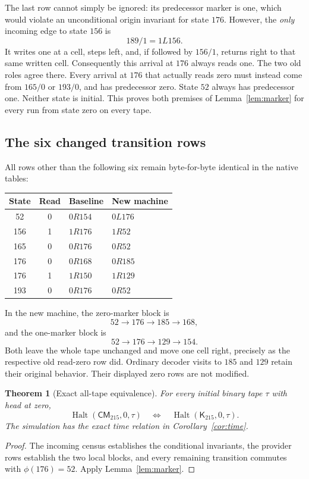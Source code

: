 \documentclass[11pt]{article}
\newtheorem{theorem}{Theorem}[section]
\theoremstyle{definition}\newtheorem{definition}[theorem]{Definition}
\theoremstyle{remark}\newtheorem{remark}[theorem]{Remark}
\newcommand{\Halt}{\operatorname{Halt}}
\newcommand{\Kold}{\mathsf{K}_{215}}
\newcommand{\Knew}{\mathsf{CM}_{215}}
\begin{document}
The last row cannot simply be ignored: its predecessor marker is one,
which would violate an unconditional origin invariant for state $176$.
However, the \emph{only} incoming edge to state $156$ is
\[
 189/1=1L156.
\]
It writes one at a cell, steps left, and, if followed by $156/1$, returns
right to that same written cell. Consequently this arrival at $176$
always reads one. The two old roles agree there. Every arrival at $176$
that actually reads zero must instead come from $165/0$ or $193/0$, and
has predecessor zero. State $52$ always has predecessor one. Neither
state is initial. This proves both premises of Lemma~\ref{lem:marker}
for every run from state zero on every tape.

\subsection{The six changed transition rows}

All rows other than the following six remain byte-for-byte identical in
the native tables:
\begin{center}
\begin{tabular}{ccll}
\toprule
State & Read & Baseline & New machine \\
\midrule
52 & 0 & $0R154$ & $0L176$ \\
156 & 1 & $1R176$ & $1R52$ \\
165 & 0 & $0R176$ & $0R52$ \\
176 & 0 & $0R168$ & $0R185$ \\
176 & 1 & $1R150$ & $1R129$ \\
193 & 0 & $0R176$ & $0R52$ \\
\bottomrule
\end{tabular}
\end{center}

In the new machine, the zero-marker block is
\[
 52\longrightarrow176\longrightarrow185\longrightarrow168,
\]
and the one-marker block is
\[
 52\longrightarrow176\longrightarrow129\longrightarrow154.
\]
Both leave the whole tape unchanged and move one cell right, precisely as
the respective old read-zero row did. Ordinary decoder visits to $185$
and $129$ retain their original behavior. Their displayed zero rows are
not modified.

\begin{theorem}[Exact all-tape equivalence]\label{thm:alltape}
For every initial binary tape $\tau$ with head at zero,
\[
 \Halt(\Knew,0,\tau)\quad\Longleftrightarrow\quad
 \Halt(\Kold,0,\tau).
\]
The simulation has the exact time relation in Corollary~\ref{cor:time}.
\end{theorem}
\begin{proof}
The incoming census establishes the conditional invariants, the provider
rows establish the two local blocks, and every remaining transition
commutes with $\phi(176)=52$. Apply Lemma~\ref{lem:marker}.
\end{proof}
\end{document}
